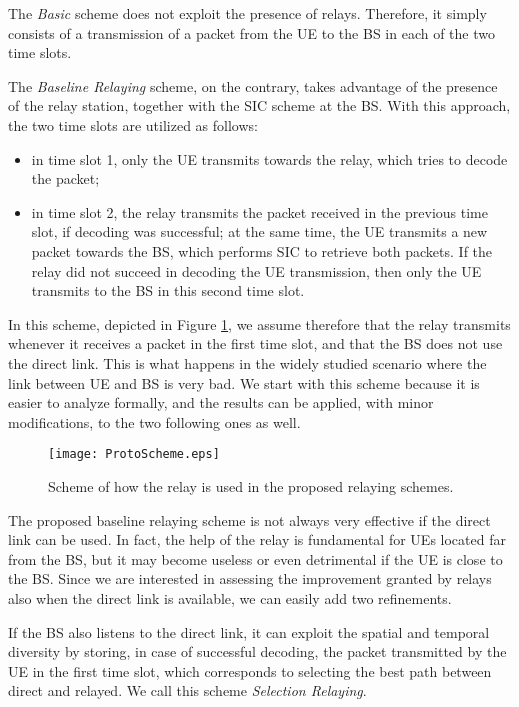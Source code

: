 \documentclass[12pt, letterpaper, onecolumn, draftcls]{IEEEtran}
\newcommand{\figw}{0.55\columnwidth}
\begin{document}
The \textit{Basic} scheme does not exploit the presence of relays. Therefore, it simply consists of a transmission of a packet from the UE to the BS in each of the two time slots.

The \textit{Baseline Relaying} scheme, on the contrary, takes advantage of the presence of the relay station, together with the SIC scheme at the BS. With this approach, the two time slots are utilized as follows:
\begin{itemize}
 \item in time slot 1, only the UE transmits towards the relay, which tries to decode the packet;
 \item in time slot 2, the relay transmits the packet received in the previous time slot, if decoding was successful; at the same time, the UE transmits a new packet towards the BS, which performs SIC to retrieve both packets. If the relay did not succeed in decoding the UE transmission, then only the UE transmits to the BS in this second time slot.
\end{itemize}
In this scheme, depicted in Figure \ref{fig:ProtoScheme}, we assume therefore that the relay transmits whenever it receives a packet in the first time slot, and that the BS does not use the direct link. This is what happens in the widely studied scenario where the link between UE and BS is very bad.
We start with this scheme because it is easier to analyze formally, and the results can be applied, with minor modifications, to the two following ones as well.
\begin{figure}
    \centering
    \texttt{[image: ProtoScheme.eps]}
     \caption{\small Scheme of how the relay is used in the proposed relaying schemes.
}
     \vspace{-1cm}
  \label{fig:ProtoScheme}
\end{figure}

The proposed baseline relaying scheme is not always very effective if the direct link can be used. In fact, the help of the relay is fundamental for UEs located far from the BS, but it may become useless or even detrimental if the UE is close to the BS. Since we are interested in assessing the improvement granted by relays also when the direct link is available, we can easily add two refinements.

If the BS also listens to the direct link, it can exploit the spatial and temporal diversity by storing, in case of successful decoding, the packet transmitted by the UE in the first time slot, which corresponds to selecting the best path between direct and relayed. We call this scheme \textit{Selection Relaying}.
\end{document}
